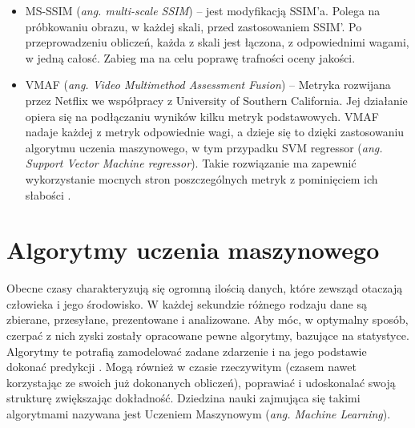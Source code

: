 \begin{itemize}[label=$\bullet$]
\item MS-SSIM ({\em ang. multi-scale SSIM}) -- jest modyfikacją SSIM'a. Polega na próbkowaniu obrazu, w każdej skali, przed zastosowaniem SSIM'. Po przeprowadzeniu obliczeń, każda z skali jest łączona, z odpowiednimi wagami, w jedną całosć. Zabieg ma na celu poprawę trafności oceny jakości\cite{ssim_2}. 
\item VMAF ({\em ang. Video Multimethod Assessment Fusion}) -- Metryka rozwijana przez Netflix we współpracy z University of Southern California. Jej działanie opiera się na podłączaniu wyników kilku metryk podstawowych. VMAF nadaje każdej z metryk odpowiednie wagi, a dzieje się to dzięki zastosowaniu algorytmu uczenia maszynowego, w tym przypadku SVM regressor ({\em ang. Support Vector Machine regressor}). Takie rozwiązanie ma zapewnić wykorzystanie mocnych stron poszczególnych metryk z pominięciem ich słabości \cite{netflix}. 
\end{itemize}

\section{Algorytmy uczenia maszynowego }

Obecne czasy charakteryzują się ogromną ilością danych, które zewsząd otaczają człowieka i jego środowisko. W każdej sekundzie różnego rodzaju dane są zbierane, przesyłane, prezentowane i analizowane. Aby móc, w optymalny sposób, czerpać z nich zyski zostały opracowane pewne algorytmy, bazujące na statystyce. Algorytmy te potrafią zamodelować zadane zdarzenie i na jego    podstawie dokonać predykcji . Mogą również w czasie rzeczywitym (czasem nawet korzystając ze swoich już dokonanych obliczeń), poprawiać i udoskonalać swoją strukturę zwiększając dokładność. Dziedzina nauki zajmująca się takimi algorytmami nazywana jest Uczeniem Maszynowym ({\em ang. Machine Learning}).\par

